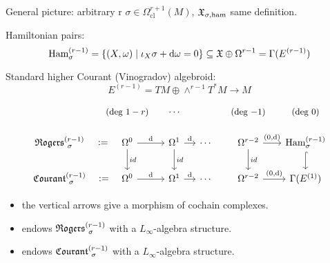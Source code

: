 \documentclass[beamer,10pt]{standalone}
\begin{document}
\begin{frame}{General picture: arbitrary r}
	$\sigma \in \Omega^{r+1}_{\mathrm{cl}}(M)$, 
	$\X_{\sigma,\ham}$ same definition.
	\vfill

	Hamiltonian pairs:
	$$
		\Ham^{(r-1)}_\sigma = 
		\{ (X,\omega) \mid \iota_X \sigma + \d \omega  = 0 \}
		\subseteq \X\oplus \Omega^{r-1} = \Gamma(E^{(r-1)})
	$$
	\vfill
	
	Standard higher Courant (Vinogradov) algebroid:
	$$ E^{(r-1)} = TM \oplus \wedge^{r-1} T^* M \to M$$
	\vfill

	\begin{displaymath}
		\begin{tikzcd}[ampersand replacement=\&,column sep = small]
			\& \text{\small (deg $1-r$)} \& \cdots \& \&\text{\small (deg $-1$)} \& \text{\small (deg $0$)} \\[-.5em]
			\Rogers[\sigma]{r-1}   \ar[r,phantom,":="]
			\&
			\Omega^0 \ar[r,"{\d}"] \ar[d,"id"]
			\&
			\Omega^1 \ar[r,"{\d}"] \ar[d,"id"]
			\&
			\cdots
			\&
			\Omega^{r-2} \ar[r,"{(0,\d)}"] \ar[d,"id"]
			\& \Ham_{\sigma}^{(r-1)} \ar[d,hook]
			\\
			\Courant[\sigma]{r-1} \ar[r,phantom,":="]
			\&
			\Omega^0 \ar[r,"{\d}"]
			\&
			\Omega^1 \ar[r,"{\d}"] 
			\&
			\cdots
			\&
			\Omega^{r-2} \ar[r,"{(0,\d)}"]
			\& \Gamma(E^{(1)})
		\end{tikzcd}
	\end{displaymath}
	\vfill

	\begin{itemize}
		\item the vertical arrows give a morphism of cochain complexes.
		\item \cite{Rogers2010} endows $\Rogers[\sigma]{r-1}$ with a $L_\infty$-algebra structure.
		\item \cite{Zambon2012} endows $\Courant[\sigma]{r-1}$ with a $L_\infty$-algebra structure.
	\end{itemize}
	\vfill
\end{frame}
\end{document}
